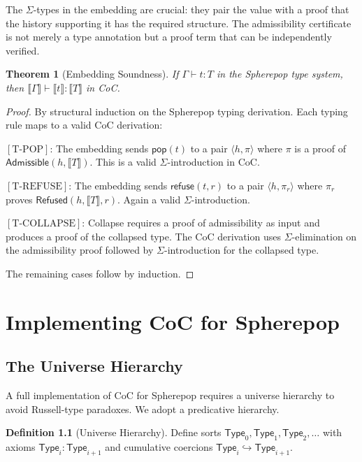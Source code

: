 \documentclass[12pt, a4paper, openany]{book}
\theoremstyle{plain}
\newtheorem{theorem}{Theorem}[chapter]
\theoremstyle{definition}
\newtheorem{definition}[theorem]{Definition}
\theoremstyle{remark}
\begin{document}
The $\Sigma$-types in the embedding are crucial: they pair the value with a
proof that the history supporting it has the required structure. The admissibility
certificate is not merely a type annotation but a proof term that can be
independently verified.

\begin{theorem}[Embedding Soundness]
If $\Gamma \vdash t : T$ in the Spherepop type system, then
$\llbracket \Gamma \rrbracket \vdash \llbracket t \rrbracket : \llbracket T \rrbracket$
in CoC.
\end{theorem}

\begin{proof}
By structural induction on the Spherepop typing derivation. Each typing rule maps
to a valid CoC derivation:

$[\mathrm{T\text{-}POP}]$: The embedding sends $\mathsf{pop}(t)$ to a pair
$\langle h, \pi \rangle$ where $\pi$ is a proof of $\mathsf{Admissible}(h, \llbracket T \rrbracket)$.
This is a valid $\Sigma$-introduction in CoC.

$[\mathrm{T\text{-}REFUSE}]$: The embedding sends $\mathsf{refuse}(t, r)$ to a
pair $\langle h, \pi_r \rangle$ where $\pi_r$ proves $\mathsf{Refused}(h, \llbracket T \rrbracket, r)$.
Again a valid $\Sigma$-introduction.

$[\mathrm{T\text{-}COLLAPSE}]$: Collapse requires a proof of admissibility as
input and produces a proof of the collapsed type. The CoC derivation uses
$\Sigma$-elimination on the admissibility proof followed by $\Sigma$-introduction
for the collapsed type.

The remaining cases follow by induction.
\end{proof}

\chapter{Implementing CoC for Spherepop}

\section{The Universe Hierarchy}

A full implementation of CoC for Spherepop requires a universe hierarchy to avoid
Russell-type paradoxes. We adopt a predicative hierarchy.

\begin{definition}[Universe Hierarchy]
Define sorts $\mathsf{Type}_0, \mathsf{Type}_1, \mathsf{Type}_2, \ldots$ with
axioms $\mathsf{Type}_i : \mathsf{Type}_{i+1}$ and cumulative coercions
$\mathsf{Type}_i \hookrightarrow \mathsf{Type}_{i+1}$.
\end{definition}
\end{document}
